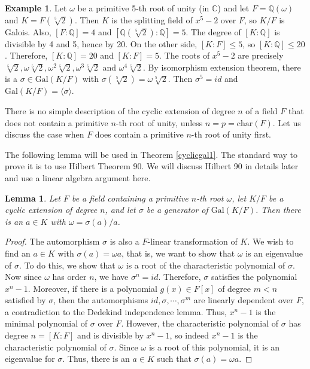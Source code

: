 \documentclass[12pt]{report}
\newtheorem{lemma}[theorem]{Lemma}
\theoremstyle{definition}
\newtheorem{example}[theorem]{Example}
\newcommand{\charr}{\text{char}}
\newcommand{\Gal}{\text{Gal}}
\newcommand{\CC}{\mathbb{C}}
\newcommand{\QQ}{\mathbb{Q}}
\begin{document}
\begin{example}
	Let $\omega$ be a primitive 5-th root of unity (in $\CC$) and let $F=\QQ(\omega)$ and $K=F(\sqrt[5]{2})$. Then $K$ is the splitting field of $x^5-2$ over $F$, so $K/F$ is Galois. Also, $[F:\QQ]=4$ and $[\QQ(\sqrt[5]{2}):\QQ]=5$. The degree of $[K:\QQ]$ is divisible by 4 and 5, hence by 20. On the other side, $[K:F]\leq 5$, so $[K:\QQ]\leq 20$. Therefore, $[K:\QQ]=20$ and $[K:F]=5$. The roots of $x^5-2$ are precisely $\sqrt[5]{2},\omega\sqrt[5]{2},\omega^2\sqrt[5]{2},\omega^3\sqrt[5]{2}$ and $\omega^4\sqrt[5]{2}$. By isomorphism extension theorem, there is a $\sigma\in \Gal(K/F)$ with $\sigma(\sqrt[5]{2})=\omega \sqrt[5]{2}$. Then $\sigma^5=id$ and $\Gal(K/F)=\langle \sigma\rangle$.
\end{example}

There is no simple description of the cyclic extension of degree $n$ of a field $F$ that does not contain a primitive $n$-th root of unity, unless $n=p=\charr(F)$. Let us discuss the case when $F$ does contain a primitive $n$-th root of unity first.

The following lemma will be used in Theorem \ref{cyclicgal1}. The standard way to prove it is to use Hilbert Theorem 90. We will discuss Hilbert 90  in details later and use a linear algebra argument here.

\begin{lemma}\label{cycliclem1}
	Let $F$ be a field containing a primitive $n$-th root $\omega$, let $K/F$ be a cyclic extension of degree $n$, and let $\sigma$ be a generator of $\Gal(K/F)$. Then there is an $a\in K$ with $\omega=\sigma(a)/a$.
\end{lemma}
\begin{proof}
	The automorphism $\sigma$ is also a $F$-linear transformation of $K$. We wish to find an $a\in K$ with $\sigma(a)=\omega a$, that is, we want to show that $\omega$ is an eigenvalue of $\sigma$. To do this, we show that $\omega$ is a root of the characteristic polynomial of $\sigma$. Now since $\omega$ has order $n$, we have $\sigma^n=id$. Therefore, $\sigma$ satisfies the polynomial $x^n-1$. Moreover, if there is a polynomial $g(x)\in F[x]$ of degree $m<n$ satisfied by $\sigma$, then the automorphisms $id,\sigma,\cdots,\sigma^{m}$ are linearly dependent over $F$, a contradiction to the Dedekind independence lemma. Thus, $x^n-1$ is the minimal polynomial of $\sigma$ over $F$. However, the characteristic polynomial of $\sigma$ has degree $n=[K:F]$ and is divisible by $x^n-1$, so indeed $x^n-1$ is the characteristic polynomial of $\sigma$. Since $\omega$ is a root of this polynomial, it is an eigenvalue for $\sigma$. Thus, there is an $a\in K$ such that $\sigma(a)=\omega a$.
\end{proof}
\end{document}
